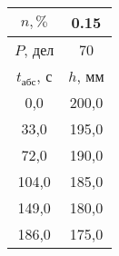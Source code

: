 \begin{tabular}[t]{|c|c|}
\hline
$n, \%$ & 0.15 \\
\hline
$P$, дел & 70 \\
\hline
$t_{абс}$, с & $h$, мм \\ 
\hline
0,0 & 200,0 \\ 
33,0 & 195,0 \\ 
72,0 & 190,0 \\ 
104,0 & 185,0 \\ 
149,0 & 180,0 \\ 
186,0 & 175,0 \\ 
\hline
\end{tabular}